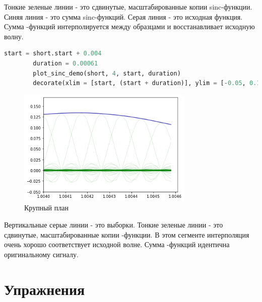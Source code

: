 \documentclass[a4paper, 12pt]{report}
\begin{document}
	Тонкие зеленые линии - это сдвинутые, масштабированные копии  sinc-функции. Синяя линия - это сумма sinc-функций. Серая линия - это исходная функция. Сумма -функций интерполируется между образцами и восстанавливает исходную волну.
	\begin{lstlisting}[language=Python,caption=Рассмотрим результат внимательнее]
		start = short.start + 0.004
		duration = 0.00061
		plot_sinc_demo(short, 4, start, duration)
		decorate(xlim = [start, (start + duration)], ylim = [-0.05, 0.17])
	\end{lstlisting}
	\begin{figure}[H]
		\centering
		\includegraphics[width=0.75\textwidth]{sinc5.png}
		\caption{Крупный план}
		\label{fig:sinc5}
	\end{figure}
	Вертикальные серые линии - это выборки. Тонкие зеленые линии - это сдвинутые, масштабированные копии -функции. В этом сегменте интерполяция очень хорошо соответствует исходной волне. Сумма -функций идентична оригинальному сигналу.
	
	\chapter{Упражнения}
\end{document}
